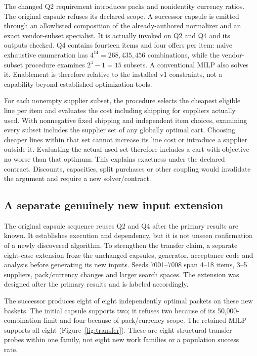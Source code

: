 The changed Q2 requirement introduces packs and nonidentity currency ratios. The original capsule refuses its declared scope. A successor capsule is emitted through an allowlisted composition of the already-authored normalizer and an exact vendor-subset specialist. It is actually invoked on Q2 and Q4 and its outputs checked. Q4 contains fourteen items and four offers per item: naive exhaustive enumeration has $4^{14}=268{,}435{,}456$ combinations, while the vendor-subset procedure examines $2^4-1=15$ subsets. A conventional MILP also solves it. Enablement is therefore relative to the installed v1 constraints, not a capability beyond established optimization tools.

For each nonempty supplier subset, the procedure selects the cheapest eligible line per item and evaluates the cost including shipping for suppliers actually used. With nonnegative fixed shipping and independent item choices, examining every subset includes the supplier set of any globally optimal cart. Choosing cheaper lines within that set cannot increase its line cost or introduce a supplier outside it. Evaluating the actual used set therefore includes a cart with objective no worse than that optimum. This explains exactness under the declared contract. Discounts, capacities, split purchases or other coupling would invalidate the argument and require a new solver/contract.

\subsection{A separate genuinely new input extension}

The original capsule sequence reuses Q2 and Q4 after the primary results are known. It establishes execution and dependency, but it is not unseen confirmation of a newly discovered algorithm. To strengthen the transfer claim, a separate eight-case extension froze the unchanged capsules, generator, acceptance code and analysis before generating its new inputs. Seeds 7001--7008 span 4--18 items, 3--5 suppliers, pack/currency changes and larger search spaces. The extension was designed after the primary results and is labeled accordingly.

The successor produces eight of eight independently optimal packets on these new baskets. The initial capsule supports two; it refuses two because of its 50,000-combination limit and four because of pack/currency scope. The retained MILP supports all eight (Figure~\ref{fig:transfer}). These are eight structural transfer probes within one family, not eight new work families or a population success rate.

